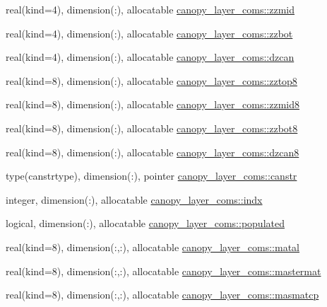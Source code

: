\begin{DoxyCompactItemize}
\item 
real(kind=4), dimension(\+:), allocatable \hyperlink{namespacecanopy__layer__coms_a708651b13f83ca19034c43fe5fef514f}{canopy\+\_\+layer\+\_\+coms\+::zzmid}
\item 
real(kind=4), dimension(\+:), allocatable \hyperlink{namespacecanopy__layer__coms_a4c8b994b7f3ea4ea983425f467310308}{canopy\+\_\+layer\+\_\+coms\+::zzbot}
\item 
real(kind=4), dimension(\+:), allocatable \hyperlink{namespacecanopy__layer__coms_ad1c041ca993f51ff5ea10ae260a4aa7c}{canopy\+\_\+layer\+\_\+coms\+::dzcan}
\item 
real(kind=8), dimension(\+:), allocatable \hyperlink{namespacecanopy__layer__coms_a365c61dc2bce371b5384ff2bbc4c2a9d}{canopy\+\_\+layer\+\_\+coms\+::zztop8}
\item 
real(kind=8), dimension(\+:), allocatable \hyperlink{namespacecanopy__layer__coms_a129061ed5b13a9746851e47fb6761d34}{canopy\+\_\+layer\+\_\+coms\+::zzmid8}
\item 
real(kind=8), dimension(\+:), allocatable \hyperlink{namespacecanopy__layer__coms_a7719283fbd377164b1912aaa64947f55}{canopy\+\_\+layer\+\_\+coms\+::zzbot8}
\item 
real(kind=8), dimension(\+:), allocatable \hyperlink{namespacecanopy__layer__coms_acb5c656adc50de1c62378239816dd7c8}{canopy\+\_\+layer\+\_\+coms\+::dzcan8}
\item 
type(canstrtype), dimension(\+:), pointer \hyperlink{namespacecanopy__layer__coms_a502cb30a5dce6c1049f734d995cf96b7}{canopy\+\_\+layer\+\_\+coms\+::canstr}
\item 
integer, dimension(\+:), allocatable \hyperlink{namespacecanopy__layer__coms_a05783dc93acf323347d52ae93a1b5857}{canopy\+\_\+layer\+\_\+coms\+::indx}
\item 
logical, dimension(\+:), allocatable \hyperlink{namespacecanopy__layer__coms_a3d5e7f8d5f502857b70216e005aebc74}{canopy\+\_\+layer\+\_\+coms\+::populated}
\item 
real(kind=8), dimension(\+:,\+:), allocatable \hyperlink{namespacecanopy__layer__coms_a4b24e2d8e68317659055ce1d96457a75}{canopy\+\_\+layer\+\_\+coms\+::matal}
\item 
real(kind=8), dimension(\+:,\+:), allocatable \hyperlink{namespacecanopy__layer__coms_aa115278bbf68142b924263dd467ad3e6}{canopy\+\_\+layer\+\_\+coms\+::mastermat}
\item 
real(kind=8), dimension(\+:,\+:), allocatable \hyperlink{namespacecanopy__layer__coms_a2953a9180b1d1c031bb78a840ae3ef74}{canopy\+\_\+layer\+\_\+coms\+::masmatcp}

\end{DoxyCompactItemize}
